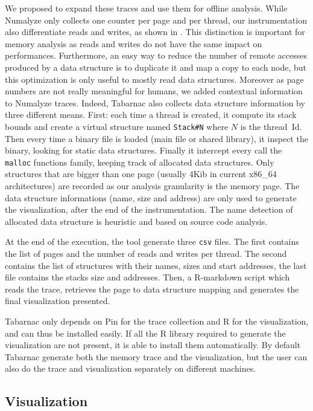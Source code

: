 We proposed to expand these traces and use them for offline analysis.
While \gls{Numalyze} only collects one counter per page and per thread, our instrumentation also differentiate reads and writes, as shown in .
This distinction is important for memory analysis as reads and writes do not have the same impact on performances.
Furthermore, an easy way to reduce the number of remote accesses produced by a data structure is to duplicate it and map a copy to each node, but this optimization is only useful to mostly read data structures.
Moreover as page numbers are not really meaningful for humans, we added contextual information to \gls{Numalyze} traces.
Indeed, \gls{Tabarnac} also collects data structure information by three different means.
First: each time a thread is created, it compute its stack bounds and create a virtual structure named \texttt{Stack\#N} where $N$ is the thread~Id.
Then every time a binary file is loaded (main file or shared library), it inspect the binary, looking for static data structures.
Finally it intercept every call the \texttt{malloc} functions family, keeping track of allocated data structures.
Only structures that are bigger than one page (usually $4$Kib in current x86\_64 architectures) are recorded as our analysis granularity is the memory page.
The data structure informations (name, size and address) are only used to generate the visualization, after the end of the instrumentation.
The name detection of allocated data structure is heuristic and based on source code analysis.

At the end of the execution, the tool generate three \texttt{csv} files.
The first contains the list of pages and the number of reads and writes per thread.
The second contains the list of structures with their names, sizes and start addresses, the last file contains the stacks size and addresses.
Then, a \gls{R-markdown} script which reads the trace, retrieves the page to data structure mapping and generates the final visualization presented.

\gls{Tabarnac} only depends on \gls{Pin} for the trace collection and \gls{R} for the visualization, and can thus be installed easily.
If all the R library required to generate the visualization are not present, it is able to install them automatically.
By default \gls{Tabarnac} generate both the memory trace and the visualization, but the user can also do the trace and visualization separately on different machines.

\subsection{Visualization}

